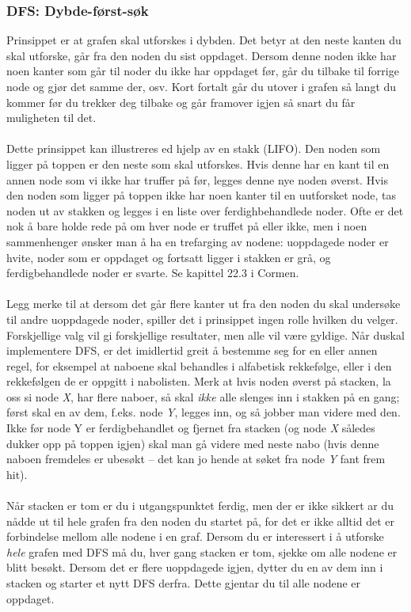 \subsubsection{DFS: Dybde-først-søk}
Prinsippet er at grafen skal utforskes i dybden. Det betyr at den neste kanten du skal utforske, går fra den noden du sist oppdaget. Dersom denne noden ikke har noen kanter som går til noder du ikke har oppdaget før, går du tilbake til forrige node og gjør det samme der, osv. Kort fortalt går du utover i grafen så langt du kommer før du trekker deg tilbake og går framover igjen så snart du får muligheten til det.
\\\\
Dette prinsippet kan illustreres ed hjelp av en stakk (LIFO). Den noden som ligger på toppen er den neste som skal utforskes. Hvis denne har en kant til en annen node som vi ikke har truffer på før, legges denne nye noden øverst. Hvis den noden som ligger på toppen ikke har noen kanter til en uutforsket node, tas noden ut av stakken og legges i en liste over ferdighbehandlede noder. Ofte er det nok å bare holde rede på om hver node er truffet på eller ikke, men i noen sammenhenger ønsker man å ha en trefarging av nodene: uoppdagede noder er hvite, noder som er oppdaget og fortsatt ligger i stakken er grå, og ferdigbehandlede noder er svarte. Se kapittel 22.3 i Cormen.
\\\\
Legg merke til at dersom det går flere kanter ut fra den noden du skal undersøke til andre uoppdagede noder, spiller det i prinsippet ingen rolle hvilken du velger. Forskjellige valg vil gi forskjellige resultater, men alle vil være gyldige. Når duskal implementere DFS, er det imidlertid greit å bestemme seg for en eller annen regel, for eksempel at naboene skal behandles i alfabetisk rekkefølge, eller i den rekkefølgen de er oppgitt i nabolisten. Merk at hvis noden øverst på stacken, la oss si node \textit{X}, har flere naboer, så skal \textit{ikke} alle slenges inn i stakken på en gang; først skal en av dem, f.eks. node \textit{Y}, legges inn, og så jobber man videre med den. Ikke før node Y er ferdigbehandlet og fjernet fra stacken (og node \textit{X} således dukker opp på toppen igjen) skal man gå videre med neste nabo (hvis denne naboen fremdeles er ubesøkt – det kan jo hende at søket fra node \textit{Y} fant frem hit).
\\\\
Når stacken er tom er du i utgangspunktet ferdig, men der er ikke sikkert ar du nådde ut til hele grafen fra den noden du startet på, for det er ikke alltid det er forbindelse mellom alle nodene i en graf. Dersom du er interessert i å utforske \textit{hele} grafen med DFS må du, hver gang stacken er tom, sjekke om alle nodene er blitt besøkt. Dersom det er flere uoppdagede igjen, dytter du en av dem inn i stacken og starter et nytt DFS derfra. Dette gjentar du til alle nodene er oppdaget.

